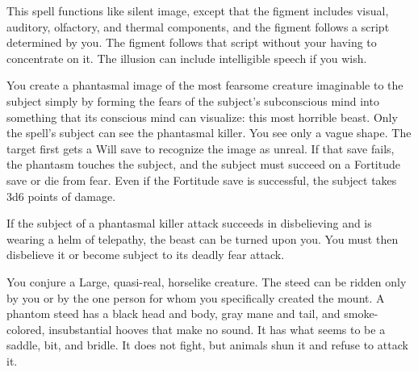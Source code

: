 \begin{multicols}{2}
\begin{small}

\smallskip\noindent This spell functions like silent image, except that the figment includes visual, auditory, olfactory, and thermal components, and the figment follows a script determined by you. The figment follows that script without your having to concentrate on it. The illusion can include intelligible speech if you wish. 


\noindent You create a phantasmal image of the most fearsome creature imaginable to the subject simply by forming the fears of the subject's subconscious mind into something that its conscious mind can visualize: this most horrible beast. Only the spell's subject can see the phantasmal killer. You see only a vague shape. The target first gets a Will save to recognize the image as unreal. If that save fails, the phantasm touches the subject, and the subject must succeed on a Fortitude save or die from fear. Even if the Fortitude save is successful, the subject takes 3d6 points of damage.

\smallskip\noindent If the subject of a phantasmal killer attack succeeds in disbelieving and is wearing a helm of telepathy, the beast can be turned upon you. You must then disbelieve it or become subject to its deadly fear attack.

\noindent You conjure a Large, quasi-real, horselike creature. The steed can be ridden only by you or by the one person for whom you specifically created the mount. A phantom steed has a black head and body, gray mane and tail, and smoke-colored, insubstantial hooves that make no sound. It has what seems to be a saddle, bit, and bridle. It does not fight, but animals shun it and refuse to attack it.


\end{small}
\end{multicols}
